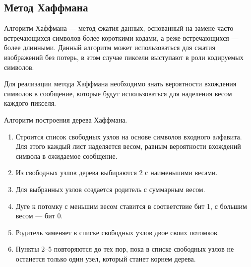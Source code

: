 



\subsection{Метод Хаффмана}

Алгоритм Хаффмана --- метод сжатия данных, основанный на замене часто встречающихся символов более короткими кодами, а реже встречающихся --- более длинными. Данный алгоритм может использоваться для сжатия изображений без потерь, в этом случае пиксели выступают в роли кодируемых символов.

Для реализации метода Хаффмана необходимо знать вероятности вхождения символов в сообщение, которые будут использоваться для наделения весом каждого пикселя.

Алгоритм построения дерева Хаффмана.
\begin{enumerate}
    \item Строится список свободных узлов на основе символов входного алфавита. Для этого каждый лист наделяется весом, равным вероятности вхождений символа в ожидаемое сообщение.
    \item Из свободных узлов дерева выбираются 2 с наименьшими весами.
    \item Для выбранных узлов создается родитель с суммарным весом.
    \item Дуге к потомку с меньшим весом ставится в соответствие бит 1, с большим весом --- бит 0.
    \item Родитель заменяет в списке свободных узлов двое своих потомков.
    \item Пункты 2--5 повторяются до тех пор, пока в списке свободных узлов не останется только один узел, который станет корнем дерева.
\end{enumerate}

